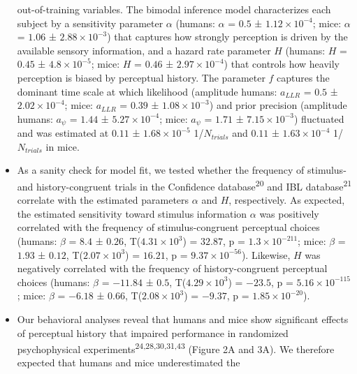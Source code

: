 \documentclass[
]{article}
\begin{document}
\begin{itemize}
  out-of-training variables. The bimodal inference model characterizes
  each subject by a sensitivity parameter \(\alpha\) (humans: \(\alpha\)
  = \(0.5\) ± \(\ensuremath{1.12\times 10^{-4}}\); mice: \(\alpha\) =
  \(1.06\) ± \(\ensuremath{2.88\times 10^{-3}}\)) that captures how
  strongly perception is driven by the available sensory information,
  and a hazard rate parameter \(H\) (humans: \(H\) = \(0.45\) ±
  \(\ensuremath{4.8\times 10^{-5}}\); mice: \(H\) = \(0.46\) ±
  \(\ensuremath{2.97\times 10^{-4}}\)) that controls how heavily
  perception is biased by perceptual history. The parameter \(f\)
  captures the dominant time scale at which likelihood (amplitude
  humans: \(a_{LLR}\) = \(0.5\) ± \(\ensuremath{2.02\times 10^{-4}}\);
  mice: \(a_{LLR}\) = \(0.39\) ± \(\ensuremath{1.08\times 10^{-3}}\))
  and prior precision (amplitude humans: \(a_{\psi}\) = \(1.44\) ±
  \(\ensuremath{5.27\times 10^{-4}}\); mice: \(a_{\psi}\) = \(1.71\) ±
  \(\ensuremath{7.15\times 10^{-3}}\)) fluctuated and was estimated at
  \(0.11\) ± \(\ensuremath{1.68\times 10^{-5}}\) 1/\(N_{trials}\) and
  \(0.11\) ± \(\ensuremath{1.63\times 10^{-4}}\) 1/\(N_{trials}\) in
  mice.
\item
  As a sanity check for model fit, we tested whether the frequency of
  stimulus- and history-congruent trials in the Confidence
  database\textsuperscript{20} and IBL database\textsuperscript{21}
  correlate with the estimated parameters \(\alpha\) and \(H\),
  respectively. As expected, the estimated sensitivity toward stimulus
  information \(\alpha\) was positively correlated with the frequency of
  stimulus-congruent perceptual choices (humans: \(\beta\) = \(8.4\) ±
  \(0.26\), T(\(\ensuremath{4.31\times 10^{3}}\)) = \(32.87\), p =
  \(\ensuremath{1.3\times 10^{-211}}\); mice: \(\beta\) = \(1.93\) ±
  \(0.12\), T(\(\ensuremath{2.07\times 10^{3}}\)) = \(16.21\), p =
  \(\ensuremath{9.37\times 10^{-56}}\)). Likewise, \(H\) was negatively
  correlated with the frequency of history-congruent perceptual choices
  (humans: \(\beta\) = \(-11.84\) ± \(0.5\),
  T(\(\ensuremath{4.29\times 10^{3}}\)) = \(-23.5\), p =
  \(\ensuremath{5.16\times 10^{-115}}\); mice: \(\beta\) = \(-6.18\) ±
  \(0.66\), T(\(\ensuremath{2.08\times 10^{3}}\)) = \(-9.37\), p =
  \(\ensuremath{1.85\times 10^{-20}}\)).
\item
  Our behavioral analyses reveal that humans and mice show significant
  effects of perceptual history that impaired performance in randomized
  psychophysical experiments\textsuperscript{24,28,30,31,43} (Figure 2A
  and 3A). We therefore expected that humans and mice underestimated the

\end{itemize}
\end{document}

